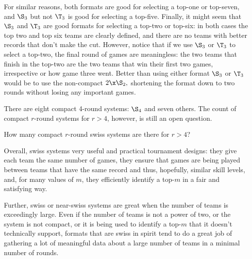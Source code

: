 {    For similar reasons, both formats are good for selecting a top-one or top-seven, and $\S_3$ but not $\T_3$ is good for selecting a top-five. Finally, it might seem that $\S_3$ and $\T_3$ are good formats for selecting a top-two or top-six: in both cases the top two and top six teams are clearly defined, and there are no teams with better records that don't make the cut. However, notice that if we use $\S_3$ or $\T_3$ to select a top-two, the final round of games are meaningless: the two teams that finish in the top-two are the two teams that win their first two games, irrespective or how game three went. Better than using either format $\S_3$ or $\T_3$ would be to use the non-compact $2\x\S_2,$ shortening the format down to two rounds without losing any important games.

    There are eight compact 4-round systems: $\S_4$ and seven others. The count of compact $r$-round systems for $r > 4$, however, is still an open question.

    \begin{oq}{}{}
        How many compact $r$-round swiss systems are there for $r > 4$?
    \end{oq}

    Overall, swiss systems very useful and practical tournament designs: they give each team the same number of games, they ensure that games are being played between teams that have the same record and thus, hopefully, similar skill levels, and, for many values of $m$, they efficiently identify a top-$m$ in a fair and satisfying way.

    Further, swiss or near-swiss systems are great when the number of teams is exceedingly large. Even if the number of teams is not a power of two, or the system is not compact, or it is being used to identify a top-$m$ that it doesn't technically support, formats that are swiss in spirit tend to do a great job of gathering a lot of meaningful data about a large number of teams in a minimal number of rounds.
}





